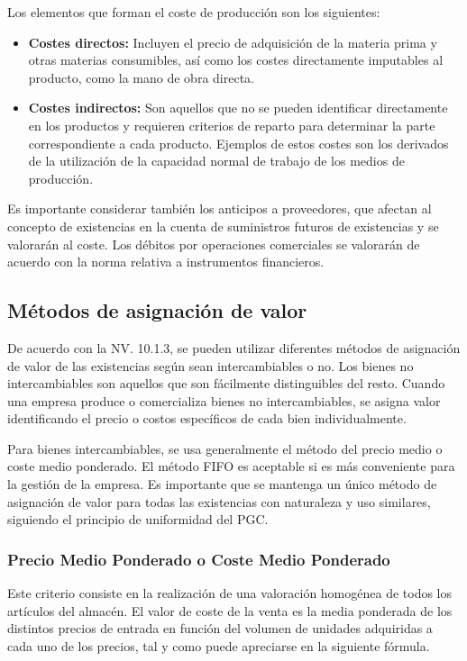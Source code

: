 \documentclass{article}
\begin{document}
Los elementos que forman el coste de producción son los siguientes:

\begin{itemize}
    \item \textbf{Costes directos:} Incluyen el precio de adquisición de la materia prima y otras materias consumibles, así como los costes directamente imputables al producto, como la mano de obra directa.
    \item \textbf{Costes indirectos:} Son aquellos que no se pueden identificar directamente en los productos y requieren criterios de reparto para determinar la parte correspondiente a cada producto. Ejemplos de estos costes son los derivados de la utilización de la capacidad normal de trabajo de los medios de producción.
\end{itemize}

Es importante considerar también los anticipos a proveedores, que afectan al concepto de existencias en la cuenta de suministros futuros de existencias y se valorarán al coste. Los débitos por operaciones comerciales se valorarán de acuerdo con la norma relativa a instrumentos financieros.

\subsection{Métodos de asignación de valor}

De acuerdo con la NV. 10.1.3, se pueden utilizar diferentes métodos de asignación de valor de las existencias según sean intercambiables o no. Los bienes no intercambiables son aquellos que son fácilmente distinguibles del resto. Cuando una empresa produce o comercializa bienes no intercambiables, se asigna valor identificando el precio o costos específicos de cada bien individualmente.

Para bienes intercambiables, se usa generalmente el método del precio medio o coste medio ponderado. El método FIFO es aceptable si es más conveniente para la gestión de la empresa. Es importante que se mantenga un único método de asignación de valor para todas las existencias con naturaleza y uso similares, siguiendo el principio de uniformidad del PGC.

\subsubsection{Precio Medio Ponderado o Coste Medio Ponderado}
Este criterio consiste en la realización de una valoración homogénea de todos los artículos del almacén. El valor de coste de la venta es la media ponderada de los distintos precios de entrada en función del volumen de unidades adquiridas a cada uno de los precios, tal y como puede apreciarse en la siguiente fórmula.
\end{document}
